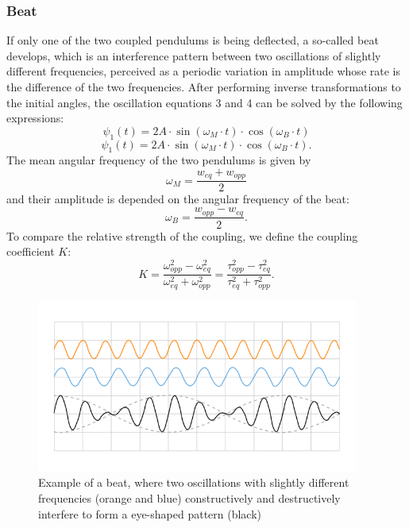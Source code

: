 \documentclass{article}
\begin{document}
\subsubsection{Beat}
If only one of the two coupled pendulums is being deflected, a so-called beat develops, which is an interference pattern between two oscillations of slightly different frequencies, perceived as a periodic variation in amplitude whose rate is the difference of the two frequencies. 
After performing inverse transformations to the initial angles, the oscillation equations 3 and 4 can be solved by the following expressions:
\begin{equation}
 \psi_1 (t) = 2A \cdot \sin(\omega_M \cdot t)  \cdot \cos(\omega_B \cdot t) 
\end{equation}
\begin{equation}
 \psi_1 (t) = 2A \cdot \sin(\omega_M \cdot t)  \cdot \cos(\omega_B \cdot t).
\end{equation}
The mean angular frequency of the two pendulums is given by
\begin{equation}
    \omega_M = \frac{w_{eq}+w_{opp}}{2}
\end{equation}
and their amplitude is depended on the angular frequency of the beat:
\begin{equation}
        \omega_B = \frac{w_{opp}-w_{eq}}{2}.
\end{equation}
To compare the relative strength of the coupling, we define the coupling coefficient $K$:
\begin{equation}
    K = \frac{\omega_{opp}^2- \omega_{eq}^2}{\omega_{eq}^2 + \omega_{opp}^2} = \frac{\tau_{opp}^2- \tau_{eq}^2}{\tau_{eq}^2 + \tau_{opp}^2}.
\end{equation}
\begin{figure}[hbt!]
\centering
\includegraphics[width=300pt]{beat.png}
\caption{Example of a beat, where two oscillations with slightly different frequencies (orange and blue) constructively and destructively interfere to form a eye-shaped pattern (black) \cite{2}}
\end{figure}
\end{document}
